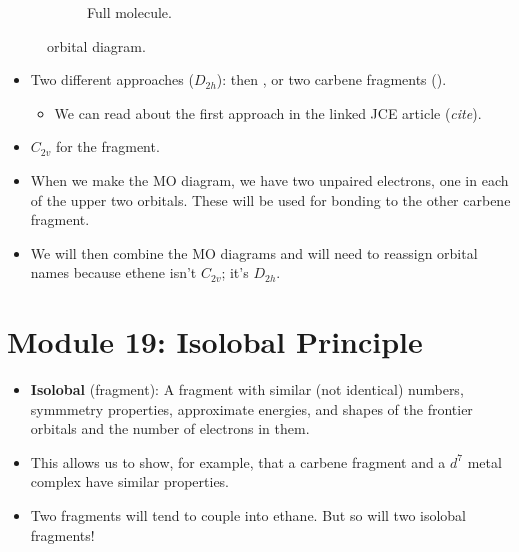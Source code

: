 \documentclass[../notes.tex]{subfiles}
\begin{document}
\begin{itemize}
\begin{figure}[h!]
\begin{subfigure}[b]{0.49\linewidth}
            \caption{Full molecule.}
            \label{fig:orbitalDiagram-C2H4b}
        \end{subfigure}
        \caption{ orbital diagram.}
        \label{fig:orbitalDiagram-C2H4}
    \end{figure}
    \begin{itemize}
        \item Two different approaches ($D_{2h}$):  then , or two carbene fragments ().
        \begin{itemize}
            \item We can read about the first approach in the linked JCE article (\emph{cite}).
        \end{itemize}
        \item $C_{2v}$ for the  fragment.
        \item When we make the MO diagram, we have two unpaired electrons, one in each of the upper two orbitals. These will be used for bonding to the other carbene fragment.
        \item We will then combine the MO diagrams and will need to reassign orbital names because ethene isn't $C_{2v}$; it's $D_{2h}$.
    \end{itemize}
\end{itemize}



\section{Module 19: Isolobal Principle}
\begin{itemize}
    \item \textbf{Isolobal} (fragment): A fragment with similar (not identical) numbers, symmmetry properties, approximate energies, and shapes of the frontier orbitals and the number of electrons in them.
    \item This allows us to show, for example, that a carbene fragment and a $d^7$ metal complex have similar properties.
    \item Two  fragments will tend to couple into ethane. But so will two isolobal  fragments!
\end{itemize}
\end{document}
